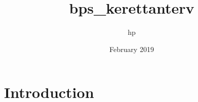 \documentclass{article}
\title{bps_kerettanterv}
\author{hp }
\date{February 2019}
\begin{document}
\maketitle

\section{Introduction}
\end{document}
